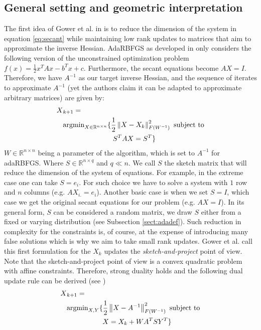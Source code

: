 \documentclass[12pt,conference,compsocconf]{IEEEtran}
\newcommand\norm[1]{\left\lVert#1\right\rVert}
\newcommand{\R}{\mathbb{R}}
\begin{document}
\subsection{General setting and geometric interpretation}\label{sect:framework}
The first idea of Gower et al. in \cite{Gower1,Gower2} is to reduce the dimension of the system in equation \ref{eq:secant} while maintaining low rank updates to matrices that aim to approximate the inverse Hessian. AdaRBFGS as developed in \cite{Gower1} only considers the following version of the unconstrained optimization problem $f(x)=\frac{1}{2}x^TAx -b^Tx + c$. Furthermore, the secant equations become $AX=I$.  Therefore, we have $A^{-1}$ as our target inverse Hessian, and the sequence of iterates to approximate $A^{-1}$ (yet the authors claim it can be adapted to approximate arbitrary matrices) are given by:
\begin{align}\label{eq:sketchandproject}
X&_{k+1} =\\ \nonumber
&\text{argmin}_{X \in \R^{n\times n}} \{\frac{1}{2}\norm{X-X_k}_{F(W^{-1})}^2 \text{ subject to}\\ &\hspace{25mm}S^TAX=S^T\} \nonumber
\end{align}
 $W \in \R^{n\times n}$ being a parameter of the algorithm, which is set to $A^{-1}$ for adaRBFGS. Where $S \in \R^{n\times q}$ and $q \ll n$. We call $S$ the sketch matrix that will reduce the dimension of the system of equations. For example, in the extreme case one can take $S=e_i$. For such choice we have to solve a system with $1$ row and $n$ columns (e.g. $AX_{i.}=e_i$). Another basic case is when we set $S=I$, which case we get the original secant equations for our problem (e.g. $AX=I$). In its general form, $S$ can be considered a random matrix, we draw $S$ either from a fixed or varying distribution (see Subsection \ref{sect:adadef}). Such reduction in complexity for the constraints is, of course, at the expense of introducing many false solutions which is why we aim to take small rank updates. Gower et al. call this first formulation for the $X_k$ updates the \textit{sketch-and-project} point of view. Note that the sketch-and-project point of view is a convex quadratic problem with affine constraints. Therefore, strong duality holds and the following dual update rule can be derived (see \cite{Gower1})
 \begin{align}\label{eq:constrainandapprox}
 X&_{k+1} =\\ \nonumber
 &\text{argmin}_{X,Y} \{\frac{1}{2}\norm{X-A^{-1}}_{F(W^{-1})}^2 \text{ subject to}\\ \nonumber 
 &\hspace{18mm} X=X_k + WA^TSY^T\}
 \end{align}
 
\end{document}
